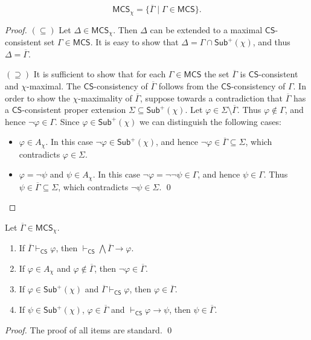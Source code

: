 \documentclass[envcountsect,envcountsame,oribibl,orivec]{llncs}
\newcommand{\CS}{\textsf{CS}}
\renewcommand{\phi}{\varphi}
\newcommand{\Sub}{\mathsf{Sub}}
\newcommand{\MCS}{\mathsf{MCS}}
\begin{document}
\begin{lemma}\label{lem:characterization of MCS-X}
\[
\MCS_\chi = \{\overline{\Gamma} \mid \Gamma\in\MCS \}.
\]
\end{lemma}
\begin{proof}
     $(\subseteq)$ Let $\Delta \in \MCS_\chi$. Then $\Delta$ can be extended to a maximal $\CS$-consistent set $\Gamma \in \MCS$. It is easy to show that $\Delta = \Gamma \cap \Sub^+(\chi)$,  and thus $\Delta = \overline{\Gamma}$.
     
     $(\supseteq)$ It is sufficient to show that for each $\Gamma \in \MCS$ the set $\overline{\Gamma}$ is $\CS$-consistent and $\chi$-maximal. The $\CS$-consistency of $\overline{\Gamma}$ follows from the $\CS$-consistency of $\Gamma$. In order to show the $\chi$-maximality of $\overline{\Gamma}$, suppose towards a contradiction that $\overline{\Gamma}$ has a $\CS$-consistent proper extension $\Sigma \subseteq \Sub^+(\chi)$. Let $\phi \in \Sigma \setminus \overline{\Gamma}$. Thus $\phi \not \in \Gamma$, and hence $\neg \phi \in \Gamma$. Since $\phi \in \Sub^+(\chi)$ we can distinguish the following cases:
          \begin{itemize}
     	\item $\phi \in A_\chi$. In this case $\neg \phi \in \Sub^+(\chi)$, and hence $\neg \phi \in \overline{\Gamma} \subseteq \Sigma$, which contradicts $\phi \in \Sigma$.
     	
     	\item $\phi = \neg \psi$ and $\psi \in A_\chi$. In this case $\neg \phi = \neg \neg \psi \in \Gamma$, and hence $\psi \in \Gamma$. Thus $\psi \in \overline{\Gamma} \subseteq \Sigma$, which contradicts $\neg \psi \in \Sigma$. \qed
     \end{itemize}
\end{proof}

\begin{lemma}\label{lem: Facts about MCS-chi}
	Let  $\overline{\Gamma} \in \MCS_\chi$.
	
	\begin{enumerate}
		\item If 
		$\overline{\Gamma} \vdash_\CS \phi$, then $\vdash_\CS \bigwedge \overline{\Gamma} \to \phi$.
		
		\item If $\phi \in A_\chi$ and  $\phi \not\in \overline{\Gamma}$, then $\neg \phi \in \overline{\Gamma}$.
		
		\item If $\phi \in \Sub^+(\chi)$ and  $\overline{\Gamma} \vdash_\CS \phi$, then $\phi \in \overline{\Gamma}$.
		
		\item If $\psi \in \Sub^+(\chi)$, $\phi \in \overline{\Gamma}$ and $\vdash_\CS \phi \rightarrow \psi$, then $\psi \in \overline{\Gamma}$.
		
	\end{enumerate}
\end{lemma}
\begin{proof}
	The proof of all items are standard. \qed 
\end{proof}
\end{document}
